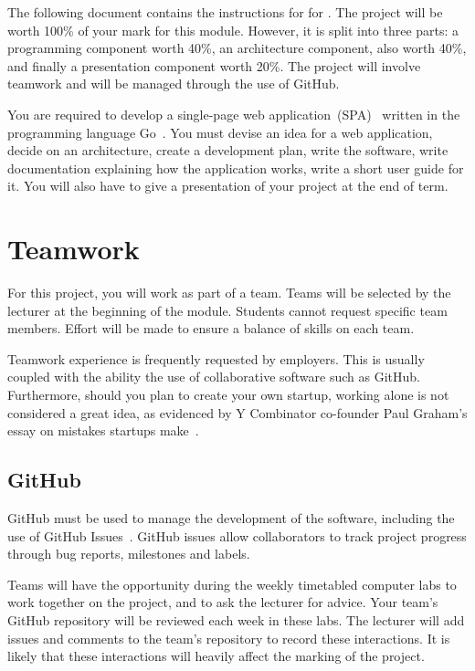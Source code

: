 \noindent
The following document contains the instructions for \projectname{} for \modulename{}.
The project will be worth 100\% of your mark for this module.
However, it is split into three parts: a programming component worth 40\%, an architecture component, also worth 40\%, and finally a presentation component worth 20\%.
The project will involve teamwork and will be managed through the use of GitHub.

You are required to develop a single-page web application (SPA)~\cite{gowebapp} written in the programming language Go~\cite{golang}.
You must devise an idea for a web application, decide on an architecture, create a development plan, write the software, write documentation explaining how the application works, write a short user guide for it.
You will also have to give a presentation of your project at the end of term.

\section*{Teamwork}
For this project, you will work as part of a team.
Teams will be selected by the lecturer at the beginning of the module.
Students cannot request specific team members.
Effort will be made to ensure a balance of skills on each team.

Teamwork experience is frequently requested by employers.
This is usually coupled with the ability the use of collaborative software such as GitHub.
Furthermore, should you plan to create your own startup, working alone is not considered a great idea, as evidenced by Y Combinator co-founder Paul Graham's essay on mistakes startups make~\cite{paulgrahammistakes}.

\subsection*{GitHub}
GitHub must be used to manage the development of the software, including the use of GitHub Issues~\cite{githubissues}.
GitHub issues allow collaborators to track project progress through bug reports, milestones and labels.

Teams will have the opportunity during the weekly timetabled computer labs to work together on the project, and to ask the lecturer for advice.
Your team's GitHub repository will be reviewed each week in these labs.
The lecturer will add issues and comments to the team's repository to record these interactions.
It is likely that these interactions will heavily affect the marking of the project.

